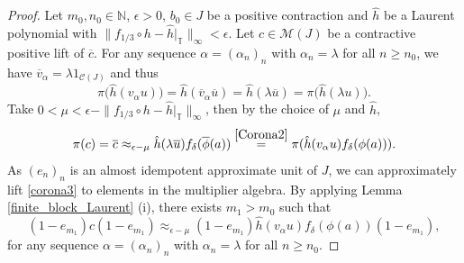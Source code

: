 \documentclass[reqno]{amsart}
\theoremstyle{definition}
\theoremstyle{remark}
\numberwithin{equation}{section}
\theoremstyle{definition}
\newcommand{\calM}{\mathcal{M}}
\begin{document}
\begin{proof}
Let $m_0,n_0\in\mathbb N$, $\epsilon>0$, $b_0\in J$ be a positive contraction and $\hat{h}$ be a Laurent polynomial with $\|f_{1/3}\circ h-\hat{h}|_{\mathbb T}\|_\infty<\epsilon$. Let $c\in \calM(J)$ be a contractive positive lift of $\overline{c}$. For any sequence $\alpha = (\alpha_{n})_{n}$ with $\alpha_n = \lambda$ for all $n\geq n_{0}$, we have $\overline{v}_{\alpha}=\lambda 1_{\mathcal C(J)}$ and thus
\begin{equation} \label{Corona2} 
\pi \big( \hat{h} (v_{\alpha} u)\big) = \hat{h} (\overline{v}_{\alpha} \overline{u} ) = \hat{h} (\lambda \overline{u}) = \pi \big(\hat{h} (\lambda u)\big). 
\end{equation} 
Take $0 < \mu < \epsilon - \|f_{1/3}\circ h-\hat{h}|_{\mathbb T}\|_\infty$, then by the choice of $\mu$ and $\hat{h}$, 
\begin{equation} \label{corona3}
\pi(c) = \overline{c} \approx_{\epsilon-\mu} \hat{h}(\lambda \overline{u}) f_{\delta}(\overline{\phi}(a)) \stackrel{\eqref{Corona2}}{=} \pi(\hat{h}(v_\alpha u)f_\delta(\phi(a))). 
\end{equation} 
As $(e_{n})_{n}$ is an almost idempotent approximate unit of $J$, we can approximately lift \eqref{corona3} to elements in the multiplier algebra. By applying Lemma \ref{finite_block_Laurent} (i), there exists $m_{1}>m_{0}$ such that 
\begin{equation} \label{corona4}
(1-e_{m_{1}})c(1-e_{m_{1}})\approx_{\epsilon - \mu} (1-e_{m_{1}})\hat{h}(v_\alpha u)f_\delta(\phi(a))(1-e_{m_{1}}), 
\end{equation} 
for any sequence $\alpha = (\alpha_{n})_{n}$ with $\alpha_n = \lambda$ for all $n\geq n_{0}$. 


\end{proof}
\end{document}
